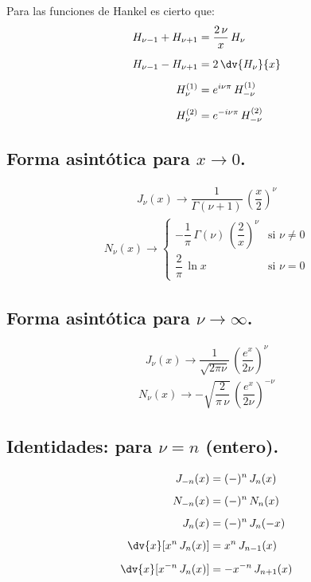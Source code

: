 \par
Para las funciones de Hankel es cierto que:
\begin{align*}
H_{\nu-1} + H_{\nu+1} &= \dfrac{2 \, \nu}{x} \, H_{\nu} \\[0.5em]
H_{\nu-1} - H_{\nu+1} &= 2 \, \dv{H_{\nu}}{x} \\[0.5em]
H_{\nu}^{(1)} &= e^{i \nu \pi} \, H_{-\nu}^{(1)} \\[0.5em]
H_{\nu}^{(2)} &= e^{-i \nu \pi} \, H_{-\nu}^{(2)} 
\end{align*}

\subsection{Forma asintótica para \texorpdfstring{$x \to 0$}{x -> 0}.}

\begin{align*}
J_{\nu} (x) \to \dfrac{1}{\Gamma (\nu + 1)} \, \left( \dfrac{x}{2} \right)^{\nu}
\end{align*}
\begin{align*}
N_{\nu} (x) \to 
\begin{cases}
- \dfrac{1}{\pi} \, \Gamma (\nu) \, \left( \dfrac{2}{x} \right)^{\nu} & \mbox{si } \nu \neq 0  \\[0.5em]
\dfrac{2}{\pi} \, \ln x & \mbox{si } \nu = 0 
\end{cases}
\end{align*}

\subsection{Forma asintótica para \texorpdfstring{$\nu \to \infty$}{nu to infty}.}

\begin{align*}
J_{\nu} (x) \to \dfrac{1}{\sqrt{2 \pi \nu}} \, \left( \dfrac{e^{x}}{2 \nu} \right)^{\nu}
\end{align*}
\begin{align*}
N_{\nu} (x) \to - \sqrt{\dfrac{2}{\pi \, \nu}} \, \left( \dfrac{e^{x}}{2 \nu} \right)^{- \nu}
\end{align*}

\subsection{Identidades: para \texorpdfstring{$\nu = n$}{nu = n} (entero).}

\begin{align*}
J_{-n} (x) &= (-)^{n} \, J_{n}(x) \\[0.5em]
N_{-n} (x) &= (-)^{n} \, N_{n}(x) \\[0.5em]
J_{n} (x) &= (-)^{n} \, J_{n}(-x) \\[0.5em]
\dv{x} [x^{n} \, J_{n}(x)] &=  x^{n} \, J_{n-1}(x) \\[0.5em]
\dv{x} [x^{-n} \, J_{n}(x)] &=  -x^{-n} \, J_{n+1}(x)
\end{align*}

